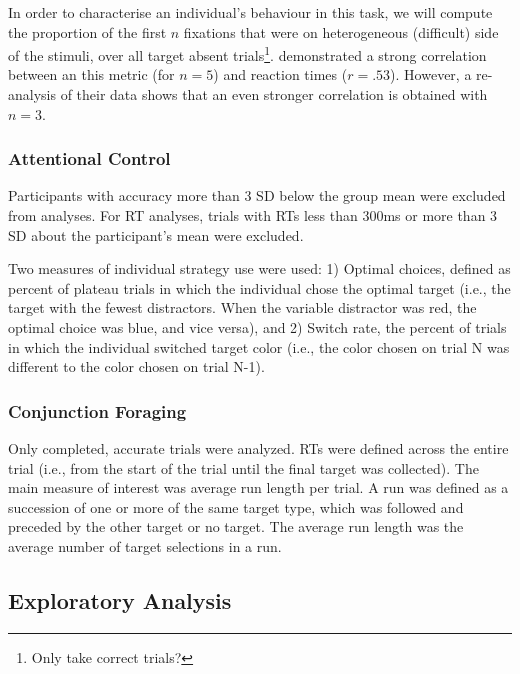 \documentclass[]{rsos}%
\begin{document}
In order to characterise an individual's behaviour in this task, we will compute the proportion of the first $n$ fixations that were on heterogeneous (difficult) side of the stimuli, over all target absent trials\footnote{Only take correct trials?}. \cite{nowakowsak2017} demonstrated a strong correlation between an this metric (for $n=5$) and reaction times ($r=.53$). However, a re-analysis of their data shows that an even stronger correlation is obtained with $n=3$.



\subsubsection{Attentional Control}

Participants with accuracy more than 3 SD below the group mean were excluded from analyses. For RT analyses, trials with RTs less than 300ms or more than 3 SD about the participant’s mean were excluded. 

Two measures of individual strategy use were used: 1) Optimal choices, defined as percent of plateau trials in which the individual chose the optimal target (i.e., the target with the fewest distractors. When the variable distractor was red, the optimal choice was blue, and vice versa), and 2) Switch rate, the percent of trials in which the individual switched target color (i.e., the color chosen on trial N was different to the color chosen on trial N-1).  

\subsubsection{Conjunction Foraging}

Only completed, accurate trials were analyzed. RTs were defined across the entire trial (i.e., from the start of the trial until the final target was collected). The main measure of interest was average run length per trial. A run was defined as a succession of one or more of the same target type, which was followed and preceded by the other target or no target. The average run length was the average number of target selections in a run. 

\subsubsection{}


\subsection{Exploratory Analysis}
\end{document}
